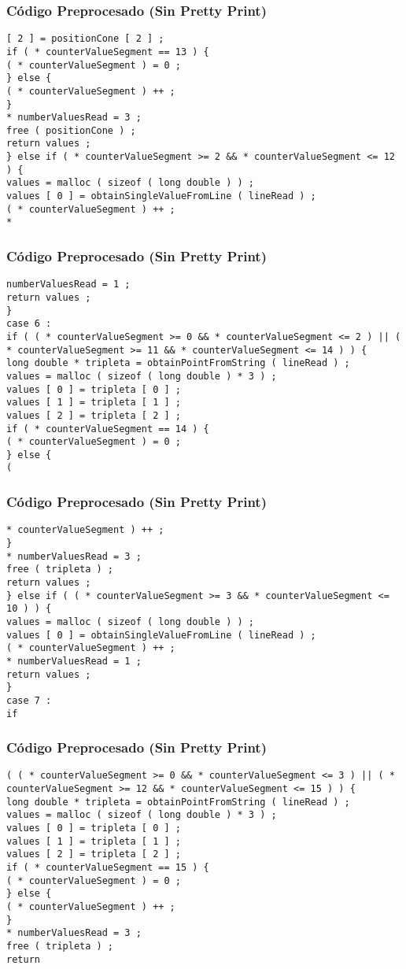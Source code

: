 \documentclass{beamer}
\begin{document}
\begin{frame}[fragile]
\frametitle{C\'odigo Preprocesado (Sin Pretty Print)}
\begin{lstlisting}[style=CStyle]
[ 2 ] = positionCone [ 2 ] ; 
if ( * counterValueSegment == 13 ) { 
( * counterValueSegment ) = 0 ; 
} else { 
( * counterValueSegment ) ++ ; 
} 
* numberValuesRead = 3 ; 
free ( positionCone ) ; 
return values ; 
} else if ( * counterValueSegment >= 2 && * counterValueSegment <= 12 ) { 
values = malloc ( sizeof ( long double ) ) ; 
values [ 0 ] = obtainSingleValueFromLine ( lineRead ) ; 
( * counterValueSegment ) ++ ; 
* \end{lstlisting}
\end{frame}
\begin{frame}[fragile]
\frametitle{C\'odigo Preprocesado (Sin Pretty Print)}
\begin{lstlisting}[style=CStyle]
numberValuesRead = 1 ; 
return values ; 
} 
case 6 : 
if ( ( * counterValueSegment >= 0 && * counterValueSegment <= 2 ) || ( * counterValueSegment >= 11 && * counterValueSegment <= 14 ) ) { 
long double * tripleta = obtainPointFromString ( lineRead ) ; 
values = malloc ( sizeof ( long double ) * 3 ) ; 
values [ 0 ] = tripleta [ 0 ] ; 
values [ 1 ] = tripleta [ 1 ] ; 
values [ 2 ] = tripleta [ 2 ] ; 
if ( * counterValueSegment == 14 ) { 
( * counterValueSegment ) = 0 ; 
} else { 
( \end{lstlisting}
\end{frame}
\begin{frame}[fragile]
\frametitle{C\'odigo Preprocesado (Sin Pretty Print)}
\begin{lstlisting}[style=CStyle]
* counterValueSegment ) ++ ; 
} 
* numberValuesRead = 3 ; 
free ( tripleta ) ; 
return values ; 
} else if ( ( * counterValueSegment >= 3 && * counterValueSegment <= 10 ) ) { 
values = malloc ( sizeof ( long double ) ) ; 
values [ 0 ] = obtainSingleValueFromLine ( lineRead ) ; 
( * counterValueSegment ) ++ ; 
* numberValuesRead = 1 ; 
return values ; 
} 
case 7 : 
if \end{lstlisting}
\end{frame}
\begin{frame}[fragile]
\frametitle{C\'odigo Preprocesado (Sin Pretty Print)}
\begin{lstlisting}[style=CStyle]
( ( * counterValueSegment >= 0 && * counterValueSegment <= 3 ) || ( * counterValueSegment >= 12 && * counterValueSegment <= 15 ) ) { 
long double * tripleta = obtainPointFromString ( lineRead ) ; 
values = malloc ( sizeof ( long double ) * 3 ) ; 
values [ 0 ] = tripleta [ 0 ] ; 
values [ 1 ] = tripleta [ 1 ] ; 
values [ 2 ] = tripleta [ 2 ] ; 
if ( * counterValueSegment == 15 ) { 
( * counterValueSegment ) = 0 ; 
} else { 
( * counterValueSegment ) ++ ; 
} 
* numberValuesRead = 3 ; 
free ( tripleta ) ; 
return \end{lstlisting}
\end{frame}
\end{document}
